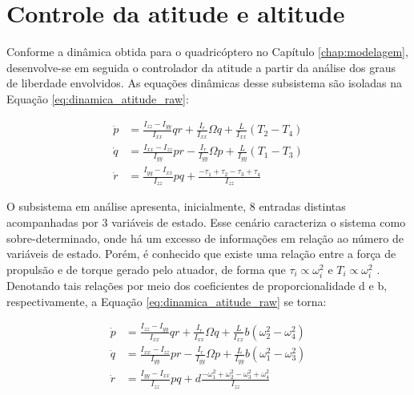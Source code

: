 \documentclass[main.tex]{subfiles}
\begin{document}
\chapter{Controle da atitude e altitude}\label{chap:controle}

Conforme a dinâmica obtida para o quadricóptero no Capítulo \ref{chap:modelagem}, desenvolve-se em seguida o controlador da atitude a partir da análise dos graus de liberdade envolvidos. As equações dinâmicas desse subsistema são isoladas na Equação \ref{eq:dinamica_atitude_raw}:

\begin{equation}\label{eq:dinamica_atitude_raw}
    \begin{split}
        \dot{p} &= \frac{I_{zz} - I_{yy}}{I_{xx}}qr + \frac{I_r}{I_{xx}}\Omega q + \frac{L}{I_{xx}}(T_2 - T_4)\\
        \dot{q} &= \frac{I_{xx} - I_{zz}}{I_{yy}}pr - \frac{I_r}{I_{yy}}\Omega p + \frac{L}{I_{yy}}(T_1 - T_3)\\
        \dot{r} &= \frac{I_{yy} - I_{xx}}{I_{zz}}pq + \frac{-\tau_1 + \tau_2 - \tau_3 + \tau_4}{I_{zz}}
    \end{split}  
\end{equation}

O subsistema em análise apresenta, inicialmente, 8 entradas distintas acompanhadas por 3 variáveis de estado. Esse cenário caracteriza o sistema como sobre-determinado, onde há um excesso de informações em relação ao número de variáveis de estado. Porém, é conhecido que existe uma relação entre a força de propulsão e de torque gerado pelo atuador, de forma que $\tau_i \propto \omega_i^2$ e $T_i \propto \omega_i^2$ \cite{rotor-quad}. Denotando tais relações por meio dos coeficientes de proporcionalidade d e b, respectivamente, a Equação \ref{eq:dinamica_atitude_raw} se torna:

\begin{equation}\label{eq:dinamica_atitude_raw_omega}
    \begin{split}
        \dot{p} &= \frac{I_{zz} - I_{yy}}{I_{xx}}qr + \frac{I_r}{I_{xx}}\Omega q + \frac{L}{I_{xx}}b(\omega^2_2 - \omega^2_4)\\
        \dot{q} &= \frac{I_{xx} - I_{zz}}{I_{yy}}pr - \frac{I_r}{I_{yy}}\Omega p + \frac{L}{I_{yy}}b(\omega^2_1 - \omega^2_3)\\
        \dot{r} &= \frac{I_{yy} - I_{xx}}{I_{zz}}pq + d\frac{-\omega^2_1 + \omega^2_2 - \omega^2_3 + \omega^2_4}{I_{zz}}
    \end{split} 
\end{equation}
\end{document}

